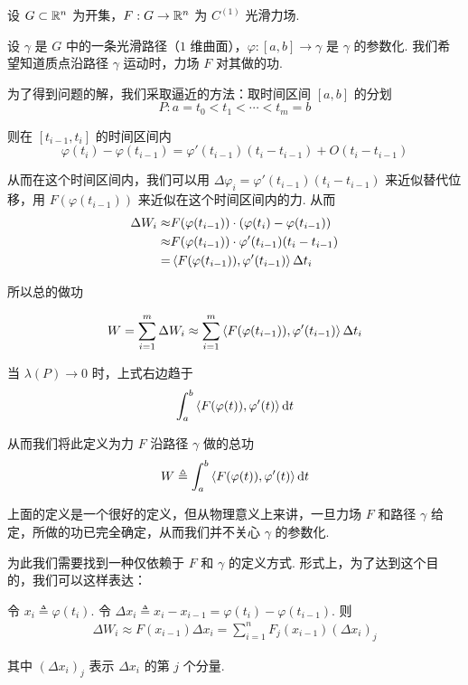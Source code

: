 

设 $G\subset\mathbb{R}^n$ 为开集，$F:G\to\mathbb{R}^n$ 为 $C^{(1)}$ 光滑力场.

设 $\gamma$ 是 $G$ 中的一条光滑路径（$1$ 维曲面），$\varphi:[a,b]\to\gamma$ 是 $\gamma$ 的参数化. 我们希望知道质点沿路径 $\gamma$ 运动时，力场 $F$ 对其做的功.

为了得到问题的解，我们采取逼近的方法：取时间区间 $[a,b]$ 的分划
$$
P:a=t_0<t_1<\cdots<t_m=b
$$

则在 $[t_{i-1},t_i]$ 的时间区间内
$$
\varphi(t_i)-\varphi(t_{i-1})=\varphi'(t_{i-1})(t_i-t_{i-1})+O(t_i-t_{i-1})
$$


从而在这个时间区间内，我们可以用 $\Delta\varphi_i=\varphi'(t_{i-1})(t_i-t_{i-1})$ 来近似替代位移，用 $F(\varphi(t_{i-1}))$ 来近似在这个时间区间内的力. 从而
$$
\begin{aligned}
\Delta W_i\approx&F(\varphi(t_{i-1}))\cdot(\varphi(t_i)-\varphi(t_{i-1}))\\
\approx&F(\varphi(t_{i-1}))\cdot\varphi'(t_{i-1})(t_i-t_{i-1})\\
=&\left\langle{F(\varphi(t_{i-1})),\varphi'(t_{i-1})}\right\rangle\Delta t_i
\end{aligned}
$$

所以总的做功

$$
W=\sum_{i=1}^m\Delta W_i\approx\sum_{i=1}^m\left\langle{F(\varphi(t_{i-1})),\varphi'(t_{i-1})}\right\rangle\Delta t_i
$$

当 $\lambda(P)\to 0$ 时，上式右边趋于
$$
\int_a^b\left\langle{F(\varphi(t)),\varphi'(t)}\right\rangle\mathrm{d} t
$$

从而我们将此定义为力 $F$ 沿路径 $\gamma$ 做的总功
$$
W\triangleq\int_a^b\left\langle{F(\varphi(t)),\varphi'(t)}\right\rangle\mathrm{d} t
$$

上面的定义是一个很好的定义，但从物理意义上来讲，一旦力场 $F$ 和路径 $\gamma$ 给定，所做的功已完全确定，从而我们并不关心 $\gamma$ 的参数化.

为此我们需要找到一种仅依赖于 $F$ 和 $\gamma$ 的定义方式. 形式上，为了达到这个目的，我们可以这样表达：

令 $x_i\triangleq\varphi(t_i)$. 令 $\Delta x_i\triangleq x_i-x_{i-1}=\varphi(t_i)-\varphi(t_{i-1})$. 则
$$
\begin{aligned}
    \Delta W_i\approx F(x_{i-1})\Delta x_i=\sum_{i=1}^nF_j(x_{i-1})(\Delta x_i)_j
\end{aligned}
$$

其中 $(\Delta x_i)_j$ 表示 $\Delta x_i$ 的第 $j$ 个分量.

